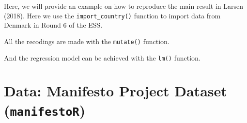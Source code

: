 \documentclass[12pt,oneside]{reedthesis}
\theoremstyle{definition}
\theoremstyle{definition}
\theoremstyle{definition}
\theoremstyle{remark}
\begin{document}
  Here, we will provide an example on how to reproduce the main result in
  Larsen (2018). Here we use the \texttt{import\_country()} function to
  import data from Denmark in Round 6 of the ESS.
  \begin{Shaded}
  \begin{Highlighting}[]
  \StringTok{ }\NormalTok{(}\NormalTok{, }\NormalTok{)}
  \end{Highlighting}
  \end{Shaded}
  All the recodings are made with the \texttt{mutate()} function.
  \begin{Shaded}
  \end{Shaded}
  And the regression model can be achieved with the \texttt{lm()}
  function.
  \begin{Shaded}
  \begin{Highlighting}[]
  \OperatorTok{~}\StringTok{ }
  \end{Highlighting}
  \end{Shaded}
  \section{\texorpdfstring{Data: Manifesto Project Dataset
  (\texttt{manifestoR})}{Data: Manifesto Project Dataset (manifestoR)}}\label{data-manifesto-project-dataset-manifestor}
  
\end{document}
